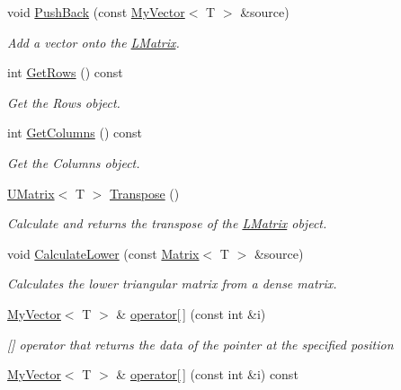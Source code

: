 \begin{DoxyCompactItemize}
void \mbox{\hyperlink{class_l_matrix_a3f82539f6b2251d49a2e39c7c359b92d}{Push\+Back}} (const \mbox{\hyperlink{class_my_vector}{My\+Vector}}$<$ T $>$ \&source)
\begin{DoxyCompactList}\small\item\em Add a vector onto the \mbox{\hyperlink{class_l_matrix}{L\+Matrix}}. \end{DoxyCompactList}\item 
int \mbox{\hyperlink{class_l_matrix_ad4ed9d329dbd01d010504a97b3879442}{Get\+Rows}} () const
\begin{DoxyCompactList}\small\item\em Get the Rows object. \end{DoxyCompactList}\item 
int \mbox{\hyperlink{class_l_matrix_ae7adc0f92e3648751fe49852ad158ea2}{Get\+Columns}} () const
\begin{DoxyCompactList}\small\item\em Get the Columns object. \end{DoxyCompactList}\item 
\mbox{\hyperlink{class_u_matrix}{U\+Matrix}}$<$ T $>$ \mbox{\hyperlink{class_l_matrix_afe89d1c0c91d284ff0277da586dc667a}{Transpose}} ()
\begin{DoxyCompactList}\small\item\em Calculate and returns the transpose of the \mbox{\hyperlink{class_l_matrix}{L\+Matrix}} object. \end{DoxyCompactList}\item 
void \mbox{\hyperlink{class_l_matrix_a9a70080e771867dd76c983fe1f8c2c15}{Calculate\+Lower}} (const \mbox{\hyperlink{class_matrix}{Matrix}}$<$ T $>$ \&source)
\begin{DoxyCompactList}\small\item\em Calculates the lower triangular matrix from a dense matrix. \end{DoxyCompactList}\item 
\mbox{\hyperlink{class_my_vector}{My\+Vector}}$<$ T $>$ \& \mbox{\hyperlink{class_l_matrix_a7eab2a6c57437448d21a04484844e359}{operator\mbox{[}$\,$\mbox{]}}} (const int \&i)
\begin{DoxyCompactList}\small\item\em \mbox{[}\mbox{]} operator that returns the data of the pointer at the specified position \end{DoxyCompactList}\item 
\mbox{\hyperlink{class_my_vector}{My\+Vector}}$<$ T $>$ \& \mbox{\hyperlink{class_l_matrix_a56ec5ba9be0bb900ddc0ee7c5283bccd}{operator\mbox{[}$\,$\mbox{]}}} (const int \&i) const

\end{DoxyCompactItemize}
